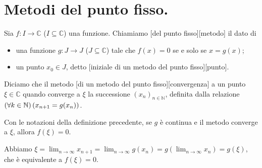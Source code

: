 \section{Metodi del punto fisso.}
\label{MetodiNumericiPerLaRisoluzioneDiEquazioni_MetodiDelPuntoFisso}
\begin{Definition}
	Sia $f: I \rightarrow \mathbb{C}$ ($I \subseteq \mathbb{C}$) una funzione. Chiamiamo [del punto fisso][metodo] il dato di
	\begin{itemize}
		\item una funzione $g: J \rightarrow J$ ($J\subseteq \mathbb{C}$) tale che $f(x) = 0$ se e solo se $x = g(x)$;
		\item un punto $x_0 \in J$, detto [iniziale di un metodo del punto fisso][punto].
	\end{itemize}
	Diciamo che il metodo [di un metodo del punto fisso][convergenza] a un punto $\xi \in \mathbb{C}$ quando converge a $\xi$ la successione $(x_n)_{n \in \mathbb{N}}$, definita dalla relazione $\left ( \forall k \in \mathbb{N} \right ) \left ( x_{n + 1} = g(x_n) \right )$.
\end{Definition}
\begin{Theorem}
	Con le notazioni della definizione precedente, se $g$ \`e continua e il metodo converge a $\xi$, allora $f(\xi) = 0$.
\end{Theorem}
\Proof Abbiamo $\xi = \lim_{n \rightarrow \infty} x_{n + 1} = \lim_{n \rightarrow \infty} g(x_n) = g \left ( \lim_{n \rightarrow \infty} x_n \right ) = g(\xi)$, che \`e equivalente a $f(\xi) = 0$. \EndProof


